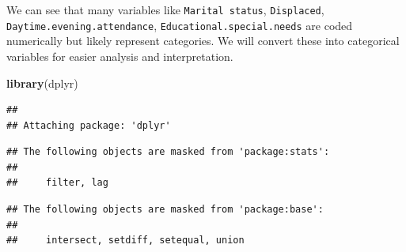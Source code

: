 \documentclass[
]{article}
\newenvironment{Shaded}{\begin{snugshade}}{\end{snugshade}}
\newcommand{\FunctionTok}[1]{\textcolor[rgb]{0.13,0.29,0.53}{\textbf{#1}}}
\newcommand{\NormalTok}[1]{#1}
\begin{document}
We can see that many variables like \texttt{Marital\ status},
\texttt{Displaced}, \texttt{Daytime.evening.attendance},
\texttt{Educational.special.needs} are coded numerically but likely
represent categories. We will convert these into categorical variables
for easier analysis and interpretation.

\begin{Shaded}
\begin{Highlighting}[]
\FunctionTok{library}\NormalTok{(dplyr)}
\end{Highlighting}
\end{Shaded}

\begin{verbatim}
## 
## Attaching package: 'dplyr'
\end{verbatim}

\begin{verbatim}
## The following objects are masked from 'package:stats':
## 
##     filter, lag
\end{verbatim}

\begin{verbatim}
## The following objects are masked from 'package:base':
## 
##     intersect, setdiff, setequal, union
\end{verbatim}
\end{document}
